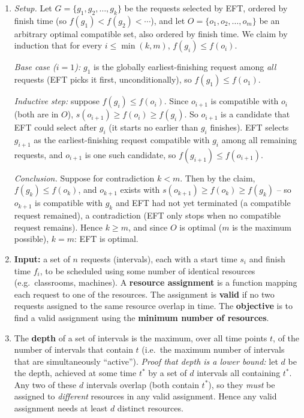 \documentclass[11pt]{article}
\begin{document}
\begin{enumerate}[label=\textbf{A\arabic*.}, leftmargin=2.2em]
\item \textit{Setup.} Let $G = \{g_1, g_2, \ldots, g_k\}$ be the requests selected by EFT,
ordered by finish time (so $f(g_1) < f(g_2) < \cdots$), and let $O = \{o_1, o_2, \ldots,
o_m\}$ be an arbitrary optimal compatible set, also ordered by finish time. We claim by
induction that for every $i \le \min(k,m)$, $f(g_i) \le f(o_i)$.

\textit{Base case ($i=1$):} $g_1$ is the globally earliest-finishing request among
\emph{all} requests (EFT picks it first, unconditionally), so $f(g_1) \le f(o_1)$.

\textit{Inductive step:} suppose $f(g_i) \le f(o_i)$. Since $o_{i+1}$ is compatible with
$o_i$ (both are in $O$), $s(o_{i+1}) \ge f(o_i) \ge f(g_i)$. So $o_{i+1}$ is a candidate
that EFT could select after $g_i$ (it starts no earlier than $g_i$ finishes). EFT selects
$g_{i+1}$ as the earliest-finishing request compatible with $g_i$ among all remaining
requests, and $o_{i+1}$ is one such candidate, so $f(g_{i+1}) \le f(o_{i+1})$.

\textit{Conclusion.} Suppose for contradiction $k < m$. Then by the claim, $f(g_k) \le
f(o_k)$, and $o_{k+1}$ exists with $s(o_{k+1}) \ge f(o_k) \ge f(g_k)$ -- so $o_{k+1}$ is
compatible with $g_k$ and EFT had not yet terminated (a compatible request remained), a
contradiction (EFT only stops when no compatible request remains). Hence $k \ge m$, and
since $O$ is optimal ($m$ is the maximum possible), $k = m$: EFT is optimal.

\item \textbf{Input:} a set of $n$ requests (intervals), each with a start time $s_i$ and
finish time $f_i$, to be scheduled using some number of identical resources (e.g.\
classrooms, machines). A \textbf{resource assignment} is a function mapping each request
to one of the resources. The assignment is \textbf{valid} if no two requests assigned to
the same resource overlap in time. The \textbf{objective} is to find a valid assignment
using the \textbf{minimum number of resources}.

\item The \textbf{depth} of a set of intervals is the maximum, over all time points $t$,
of the number of intervals that contain $t$ (i.e.\ the maximum number of intervals that
are simultaneously ``active''). \textit{Proof that depth is a lower bound:} let $d$ be the
depth, achieved at some time $t^*$ by a set of $d$ intervals all containing $t^*$. Any two
of these $d$ intervals overlap (both contain $t^*$), so they \emph{must} be assigned to
\emph{different} resources in any valid assignment. Hence any valid assignment needs at
least $d$ distinct resources.


\end{enumerate}
\end{document}
